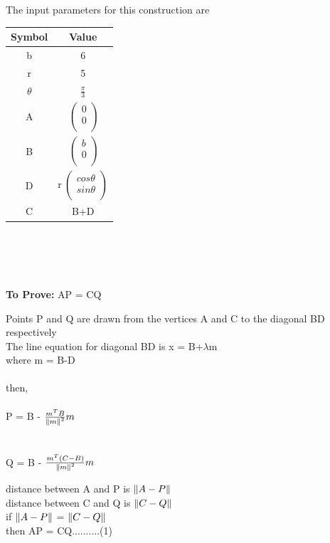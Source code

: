 \documentclass[10pt, a4paper]{article}
\begin{document}
The input parameters for this construction are 
\begin{center}
\begin{tabular}{|c|c|}
	\hline
	\textbf{Symbol}&\textbf{Value}\\
	\hline
	b&6\\
	\hline
	r&5\\
	\hline
	$\theta$&$\frac{\pi}{3}$\\
	\hline
	A&$\
	\begin{pmatrix}
		0 \\
		0 \\
	\end{pmatrix}$%
	\\
	\hline
	B&$\
	\begin{pmatrix}
		b \\
		0 \\
	\end{pmatrix}$%
	\\
	\hline
	D&r$\
	\begin{pmatrix}
		cos\theta \\
		sin\theta \\
	\end{pmatrix}$%
	\\
	\hline
	C&B+D%
	\\
	\hline
\end{tabular}
\end{center}
\
\\
\
\\
\
\\
\
\\
\textbf{To Prove:} AP = CQ
		\begin{center}
		Points P and Q are drawn from the vertices A and C to the diagonal BD respectively\\
		The line equation for diagonal BD is x = B+$\lambda$m
		\\
		where m = B-D\\
		\
		\\
		then,\\
		\
		\\
		P = B - $\frac{m^T B}{\norm{m}^2}m$
	\\
	\
	\\
	\
	\\
	Q =  B - $\frac{m^T (C-B)}{\norm{m}^2}m$
	\\
	\end{center}
	
	distance between A and P is $\norm{A-P}$\\
	distance between C and Q is $\norm{C-Q}$\\
	if $\norm{A-P}$ =  $\norm{C-Q}$\\
	then AP = CQ..........(1)
	
\end{document}
